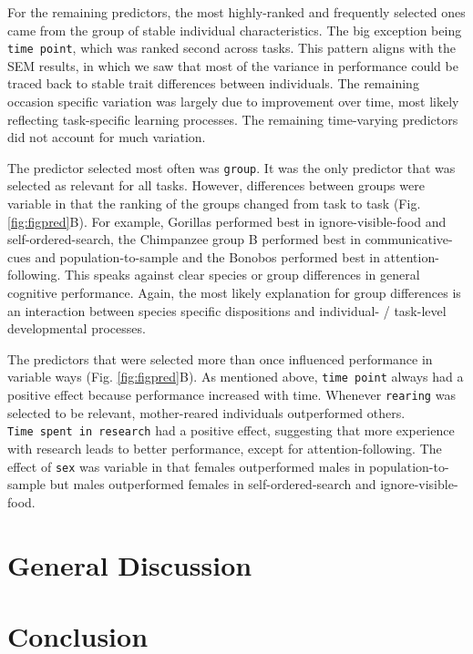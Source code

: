 \documentclass[
  man,floatsintext]{apa6}
\begin{document}
For the remaining predictors, the most highly-ranked and frequently selected ones came from the group of stable individual characteristics. The big exception being \texttt{time\ point}, which was ranked second across tasks. This pattern aligns with the SEM results, in which we saw that most of the variance in performance could be traced back to stable trait differences between individuals. The remaining occasion specific variation was largely due to improvement over time, most likely reflecting task-specific learning processes. The remaining time-varying predictors did not account for much variation.

The predictor selected most often was \texttt{group}. It was the only predictor that was selected as relevant for all tasks. However, differences between groups were variable in that the ranking of the groups changed from task to task (Fig. \ref{fig:figpred}B). For example, Gorillas performed best in ignore-visible-food and self-ordered-search, the Chimpanzee group B performed best in communicative-cues and population-to-sample and the Bonobos performed best in attention-following. This speaks against clear species or group differences in general cognitive performance. Again, the most likely explanation for group differences is an interaction between species specific dispositions and individual- / task-level developmental processes.

The predictors that were selected more than once influenced performance in variable ways (Fig. \ref{fig:figpred}B). As mentioned above, \texttt{time\ point} always had a positive effect because performance increased with time. Whenever \texttt{rearing} was selected to be relevant, mother-reared individuals outperformed others. \texttt{Time\ spent\ in\ research} had a positive effect, suggesting that more experience with research leads to better performance, except for attention-following. The effect of \texttt{sex} was variable in that females outperformed males in population-to-sample but males outperformed females in self-ordered-search and ignore-visible-food.

\hypertarget{general-discussion}{%
\section{General Discussion}\label{general-discussion}}

\hypertarget{conclusion}{%
\section{Conclusion}\label{conclusion}}
\end{document}
